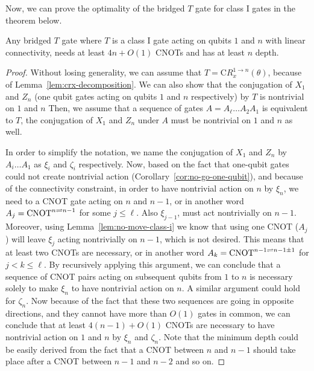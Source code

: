 Now, we can prove the optimality of the bridged $T$ gate for class I gates in the theorem below.

\begin{theorem}\label{thm:no-go-class-i}
  Any bridged $T$ gate where $T$ is a class I gate acting on qubits $1$ and $n$ with linear connectivity, needs at least $4n + O(1)$ CNOTs and has at least $n$ depth.
\end{theorem}
\begin{proof}
  Without losing generality, we can assume that $T = \mathrm{C}R_x^{1\to n}(\theta)$, because of Lemma~\ref{lem:crx-decomposition}. We can also show that the conjugation of $X_1$ and $Z_n$ (one qubit gates acting on qubits $1$ and $n$ respectively) by $T$ is nontrivial on $1$ and $n$ Then, we assume that a sequence of gates $A = A_\ell \dots A_2 A_1$ is equivalent to $T$, 
  the conjugation of $X_1$ and $Z_n$ under $A$ must be nontrivial on $1$ and $n$ as well. 

  In order to simplify the notation, we name the conjugation of $X_1$ and $Z_n$ by $A_i \dots A_1$ as $\xi_i$ and $\zeta_i$ respectively. Now, based on the fact that one-qubit gates could not create nontrivial action (Corollary~\ref{cor:no-go-one-qubit}), and because of the connectivity constraint, in order to have nontrivial action on $n$ by $\xi_n$, we need to a CNOT gate acting on $n$ and $n-1$, or in another word $A_j = \operatorname{CNOT}^{n \rightleftharpoons n-1}$ for some $j \le \ell$. Also $\xi_{j - 1}$, must act nontrivially on $n-1$. Moreover, using Lemma~\ref{lem:no-move-class-i} we know that using one CNOT ($A_j$) will leave $\xi_{j}$ acting nontrivially on $n-1$, which is not desired. This means that at least two CNOTs are necessary, or in another word $A_k = \operatorname{CNOT}^{n-1 \rightleftharpoons n-1 \pm 1}$ for $j < k \le \ell$. By recursively applying this argument, we can conclude that a sequence of CNOT pairs acting on subsequent qubits from $1$ to $n$ is necessary solely to make $\xi_n$ to have nontrivial action on $n$. A similar argument could hold for $\zeta_n$. Now because of the fact that these two sequences are going in opposite directions, and they cannot have more than $O(1)$ gates in common, we can conclude that at least $4(n-1) + O(1)$ CNOTs are necessary to have nontrivial action on $1$ and $n$ by $\xi_n$ and $\zeta_n$. Note that the minimum depth could be easily derived from the fact that a CNOT between $n$ and $n-1$ should take place after a CNOT between $n-1$ and $n-2$ and so on.
\end{proof}

